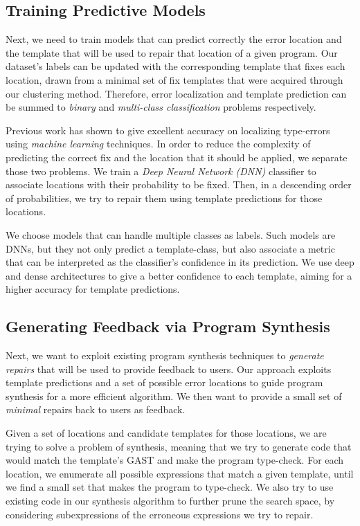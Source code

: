 \subsection{Training Predictive Models}
\label{subsec:step4}

Next, we need to train models that can predict correctly the error location and
the template that will be used to repair that location of a given program. Our
dataset's labels can be updated with the corresponding template that fixes each
location, drawn from a minimal set of fix templates that were acquired through
our clustering method. Therefore, error localization and template prediction can
be summed to \emph{binary} and \emph{multi-class classification} problems
respectively.

 Previous work has shown to give excellent accuracy
on localizing type-errors using \emph{machine learning} techniques. In order to
reduce the complexity of predicting the correct fix and the location that it
should be applied, we separate those two problems. We train a \emph{Deep Neural
Network (DNN)} classifier to associate locations with their probability to be
fixed. Then, in a descending order of probabilities, we try to repair them using
template predictions for those locations.

 We choose models that can handle multiple
classes as labels. Such models are DNNs, but they not only predict a
template-class, but also associate a metric that can be interpreted as the
classifier’s confidence in its prediction. We use deep and dense architectures
to give a better confidence to each template, aiming for a higher accuracy for
template predictions.



\subsection{Generating Feedback via Program Synthesis}
\label{subsec:step5}

Next, we want to exploit existing program synthesis techniques to \emph{generate
repairs} that will be used to provide feedback to users. Our approach exploits
template predictions and a set of possible error locations to guide program
synthesis for a more efficient algorithm. We then want to provide a small set of
\emph{minimal} repairs back to users as feedback.

 Given a set of locations and candidate templates for
those locations, we are trying to solve a problem of synthesis, meaning that we
try to generate code that would match the template’s GAST and make the program
type-check. For each location, we enumerate all possible expressions that match
a given template, until we find a small set that makes the program to
type-check. We also try to use existing code in our synthesis algorithm to
further prune the search space, by considering subexpressions of the erroneous
expressions we try to repair.

